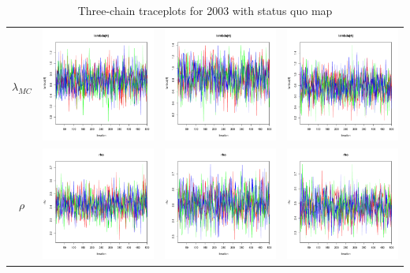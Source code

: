 \documentclass[letter,12pt]{article}
\begin{document}
\begin{table}
\begin{tabular}{cccc}
    $\lambda_{MC}$    & \includegraphics[width=.15\columnwidth]{../graphs/traceplots/2003d97v_5.pdf} &
                        \includegraphics[width=.15\columnwidth]{../graphs/traceplots/2003d97vbar_5.pdf} &
                         \includegraphics[width=.15\columnwidth]{../graphs/traceplots/2003d97wbar_5.pdf} \\
    $\rho$           & \includegraphics[width=.15\columnwidth]{../graphs/traceplots/2003d97v_7.pdf} &
                        \includegraphics[width=.15\columnwidth]{../graphs/traceplots/2003d97vbar_7.pdf} &
                         \includegraphics[width=.15\columnwidth]{../graphs/traceplots/2003d97wbar_7.pdf} \\
\end{tabular}
\caption{Three-chain traceplots for 2003 with status quo map}\label{T:traceplotStart}
\end{table}
\end{document}
